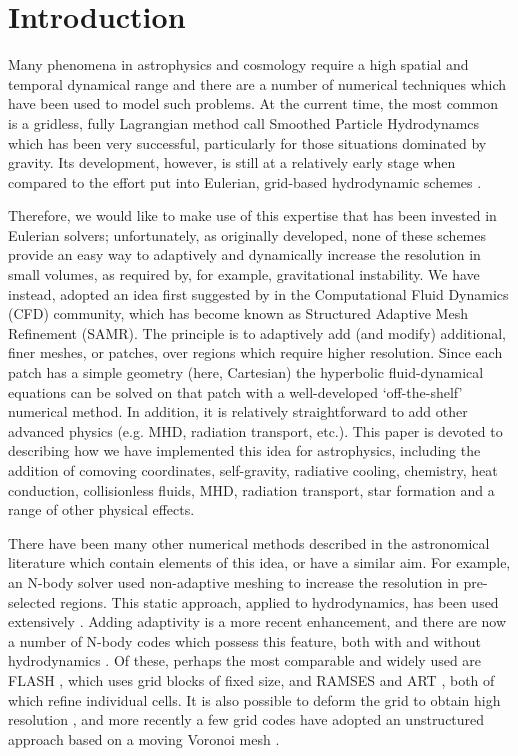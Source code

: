 
\section{Introduction}\label{sec.intro}


Many phenomena in astrophysics and cosmology require a high spatial and temporal dynamical range and there are a number of numerical techniques which have been used to model such problems.  At the current time, the most common is a gridless, fully Lagrangian method call Smoothed Particle Hydrodynamcs \citep[SPH;][]{Lucy77, SPH} which has been very successful, particularly for those situations dominated by gravity.  Its development, however, is still at a relatively early stage when compared to the effort put into Eulerian, grid-based hydrodynamic schemes \citep[e.g.,][]{laney-1998, toro-1997, Woodward84}. 

Therefore, we would like to make use of this expertise that has been invested in Eulerian solvers; unfortunately, as originally developed, none of these schemes provide an easy way to adaptively and dynamically increase the resolution in small volumes, as required by, for example, gravitational instability.  We have instead, adopted an idea first suggested by \citet{Berger89} in the Computational Fluid Dynamics (CFD) community, which has become known as Structured Adaptive Mesh Refinement (SAMR).  The principle is to adaptively add (and modify) additional, finer meshes, or patches, over regions which require higher resolution.  Since each patch has a simple geometry (here, Cartesian) the hyperbolic fluid-dynamical equations can be solved on that patch with a well-developed `off-the-shelf' numerical method.  In addition, it is relatively straightforward to add other advanced physics (e.g. MHD, radiation transport, etc.). This paper is devoted to describing how we have implemented this idea for astrophysics, including the addition of comoving coordinates, self-gravity, radiative cooling, chemistry, heat conduction, collisionless fluids, MHD, radiation transport, star formation and a range of other physical effects.

There have been many other numerical methods described in the astronomical literature which contain elements of this idea, or have a similar aim.  For example, an N-body solver \cite{Villumsen89} used non-adaptive meshing to increase the resolution in pre-selected regions.  This static approach, applied to hydrodynamics, has been used extensively \citep[e.g.,]{Ruffert94, Anninos94}.  Adding adaptivity is a more recent enhancement, and there are now a number of N-body codes which possess this feature, both with and without  hydrodynamics  \citep{Couchman91, Jessop94, Suisalu95, Splinter96, Gelato97, ART97, Truelove98, flash_method, MLAPM01,  Yahagi01, RAMSES, Quilis04, Ziegler05, Zhang06, Astrobear09, Pluto-amr, GAMER, Nyx}.  Of these, perhaps the most comparable and widely used are FLASH \citep{flash_method}, which uses grid blocks of fixed size, and RAMSES \citep{RAMSES} and ART \citep{ART97}, both of which refine individual cells.   It is also possible to deform the grid to obtain high resolution \citep[e.g.,][]{Gnedin95, Xu97, Pen98}, and more recently a few grid codes have adopted an unstructured approach based on a moving Voronoi mesh \citep{Arepo10, Tess11}.

